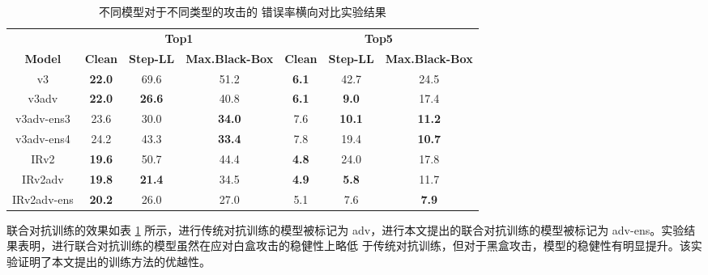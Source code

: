 \begin{table}[htbp]
\centering
\begin{tabular}{ccccccc}
               & \multicolumn{3}{c}{\textbf{Top1}}                          & \multicolumn{3}{c}{\textbf{Top5}}                          \\ \cline{2-7} 
\textbf{Model} & \textbf{Clean} & \textbf{Step-LL} & \textbf{Max.Black-Box} & \textbf{Clean} & \textbf{Step-LL} & \textbf{Max.Black-Box} \\ \hline
v3             & \textbf{22.0}  & 69.6             & 51.2                   & \textbf{6.1}   & 42.7             & 24.5                   \\
v3adv          & \textbf{22.0}  & \textbf{26.6}    & 40.8                   & \textbf{6.1}   & \textbf{9.0}     & 17.4                   \\
v3adv-ens3     & 23.6           & 30.0             & \textbf{34.0}          & 7.6            & \textbf{10.1}    & \textbf{11.2}          \\
v3adv-ens4     & 24.2           & 43.3             & \textbf{33.4}          & 7.8            & 19.4             & \textbf{10.7}          \\ \hline
IRv2           & \textbf{19.6}  & 50.7             & 44.4                   & \textbf{4.8}   & 24.0             & 17.8                   \\
IRv2adv        & \textbf{19.8}  & \textbf{21.4}    & 34.5                   & \textbf{4.9}   & \textbf{5.8}     & 11.7                   \\
IRv2adv-ens    & \textbf{20.2}  & 26.0             & 27.0                   & 5.1            & 7.6              & \textbf{7.9}           \\ \hline
\end{tabular}
\caption{不同模型对于不同类型的攻击的 错误率横向对比实验结果}
\label{tab:table4}
\end{table}

联合对抗训练的效果如表 \ref{tab:table4} 所示，进行传统对抗训练的模型被标记为  adv，进行本文提出的联合对抗训练的模型被标记为  adv-ens。实验结果表明，进行联合对抗训练的模型虽然在应对白盒攻击的稳健性上略低 于传统对抗训练，但对于黑盒攻击，模型的稳健性有明显提升。该实验证明了本文提出的训练方法的优越性。